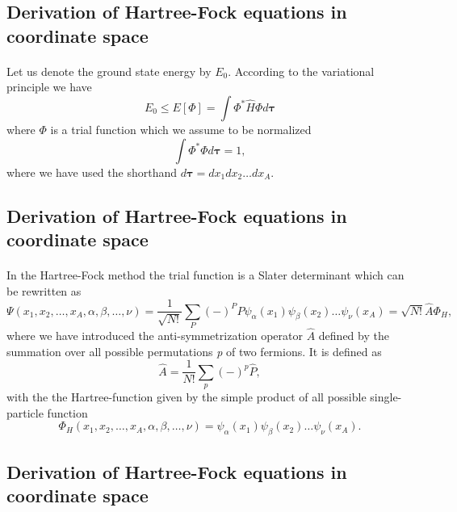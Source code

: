 \documentclass[%
twoside,                 %
final,                   %
10pt]{article}
\begin{document}
\subsection*{Derivation of Hartree-Fock equations in coordinate space}

\paragraph{}
Let us denote the ground state energy by $E_0$. According to the
variational principle we have
\[
  E_0 \le E[\Phi] = \int \Phi^*\hat{H}\Phi d\mathbf{\tau}
\]
where $\Phi$ is a trial function which we assume to be normalized
\[
  \int \Phi^*\Phi d\mathbf{\tau} = 1,
\]
where we have used the shorthand $d\mathbf{\tau}=dx_1dx_2\dots dx_A$.



\subsection*{Derivation of Hartree-Fock equations in coordinate space}

\paragraph{}
In the Hartree-Fock method the trial function is a Slater
determinant which can be rewritten as 
\[
  \Psi(x_1,x_2,\dots,x_A,\alpha,\beta,\dots,\nu) = \frac{1}{\sqrt{N!}}\sum_{P} (-)^PP\psi_{\alpha}(x_1)
    \psi_{\beta}(x_2)\dots\psi_{\nu}(x_A)=\sqrt{N!}\hat{A}\Phi_H,
\]
where we have introduced the anti-symmetrization operator $\hat{A}$ defined by the 
summation over all possible permutations \emph{p} of two fermions.
It is defined as
\[
  \hat{A} = \frac{1}{N!}\sum_{p} (-)^p\hat{P},
\]
with the the Hartree-function given by the simple product of all possible single-particle function
\[
  \Phi_H(x_1,x_2,\dots,x_A,\alpha,\beta,\dots,\nu) =
  \psi_{\alpha}(x_1)
    \psi_{\beta}(x_2)\dots\psi_{\nu}(x_A).
\]






\subsection*{Derivation of Hartree-Fock equations in coordinate space}

\end{document}

